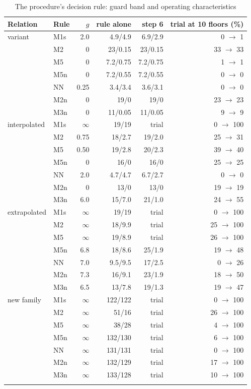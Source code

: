 \documentclass[pdflatex,sn-basic]{sn-jnl}
\newcommand{\tabsize}{\fontsize{8}{9.5}\selectfont}
\begin{document}
\begin{table}[tbp]
\tabsize
\setlength{\tabcolsep}{6pt}
\caption{The procedure's decision rule: guard band and operating characteristics}\label{tab:step6}
\begin{tabular}{@{}llrrrr@{}}
\toprule
Relation & Rule & $g$ & rule alone & step 6 & trial at 10 floors (\%) \\
\midrule
variant & M1s & 2.0 & 4.9/4.9 & 6.9/2.9 & 0 $\to$ 1 \\
 & M2 & 0 & 23/0.15 & 23/0.15 & 33 $\to$ 33 \\
 & M5 & 0 & 7.2/0.75 & 7.2/0.75 & 1 $\to$ 1 \\
 & M5n & 0 & 7.2/0.55 & 7.2/0.55 & 0 $\to$ 0 \\
 & NN & 0.25 & 3.4/3.4 & 3.6/3.1 & 0 $\to$ 0 \\
 & M2n & 0 & 19/0 & 19/0 & 23 $\to$ 23 \\
 & M3n & 0 & 11/0.05 & 11/0.05 & 9 $\to$ 9 \\
interpolated & M1s & $\infty$ & 19/19 & trial & 0 $\to$ 100 \\
 & M2 & 0.75 & 18/2.7 & 19/2.0 & 25 $\to$ 31 \\
 & M5 & 0.50 & 19/2.8 & 20/2.3 & 39 $\to$ 40 \\
 & M5n & 0 & 16/0 & 16/0 & 25 $\to$ 25 \\
 & NN & 2.0 & 4.7/4.7 & 6.7/2.7 & 0 $\to$ 0 \\
 & M2n & 0 & 13/0 & 13/0 & 19 $\to$ 19 \\
 & M3n & 6.0 & 15/7.0 & 21/1.0 & 24 $\to$ 55 \\
extrapolated & M1s & $\infty$ & 19/19 & trial & 0 $\to$ 100 \\
 & M2 & $\infty$ & 18/9.9 & trial & 25 $\to$ 100 \\
 & M5 & $\infty$ & 19/8.9 & trial & 26 $\to$ 100 \\
 & M5n & 6.8 & 18/8.6 & 25/1.9 & 19 $\to$ 48 \\
 & NN & 7.0 & 9.5/9.5 & 17/2.5 & 0 $\to$ 26 \\
 & M2n & 7.3 & 16/9.1 & 23/1.9 & 18 $\to$ 50 \\
 & M3n & 6.5 & 13/7.8 & 19/1.3 & 19 $\to$ 47 \\
new family & M1s & $\infty$ & 122/122 & trial & 0 $\to$ 100 \\
 & M2 & $\infty$ & 51/16 & trial & 26 $\to$ 100 \\
 & M5 & $\infty$ & 38/28 & trial & 4 $\to$ 100 \\
 & M5n & $\infty$ & 132/130 & trial & 6 $\to$ 100 \\
 & NN & $\infty$ & 131/131 & trial & 0 $\to$ 100 \\
 & M2n & $\infty$ & 132/129 & trial & 17 $\to$ 100 \\
 & M3n & $\infty$ & 133/128 & trial & 10 $\to$ 100 \\
\botrule
\end{tabular}
\end{table}
\end{document}
